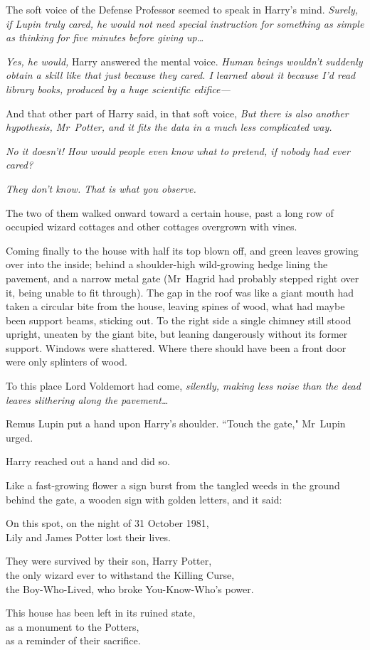 The soft voice of the Defense Professor seemed to speak in Harry's mind. \emph{Surely, if Lupin truly cared, he would not need special instruction for something as simple as thinking for five minutes before giving up{\ldots}}

\emph{Yes, he would,} Harry answered the mental voice. \emph{Human beings wouldn't suddenly obtain a skill like that just because they cared. I learned about it because I'd read library books, produced by a huge scientific edifice—}

And that other part of Harry said, in that soft voice, \emph{But there is also another hypothesis, Mr~Potter, and it fits the data in a much less complicated way.}

\emph{No it doesn't! How would people even know what to pretend, if nobody had ever cared?}

\emph{They don't know. That is what you observe.}

The two of them walked onward toward a certain house, past a long row of occupied wizard cottages and other cottages overgrown with vines.

Coming finally to the house with half its top blown off, and green leaves growing over into the inside; behind a shoulder-high wild-growing hedge lining the pavement, and a narrow metal gate (Mr~Hagrid had probably stepped right over it, being unable to fit through). The gap in the roof was like a giant mouth had taken a circular bite from the house, leaving spines of wood, what had maybe been support beams, sticking out. To the right side a single chimney still stood upright, uneaten by the giant bite, but leaning dangerously without its former support. Windows were shattered. Where there should have been a front door were only splinters of wood.

To this place Lord Voldemort had come, \emph{silently, making less noise than the dead leaves slithering along the pavement{\ldots}}

Remus Lupin put a hand upon Harry's shoulder. ``Touch the gate," Mr~Lupin urged.

Harry reached out a hand and did so.

Like a fast-growing flower a sign burst from the tangled weeds in the ground behind the gate, a wooden sign with golden letters, and it said:

\begin{center}
On this spot, on the night of 31 October 1981,\\
Lily and James Potter lost their lives.

They were survived by their son, Harry Potter,\\
the only wizard ever to withstand the Killing Curse,\\
the Boy-Who-Lived, who broke You-Know-Who's power.

This house has been left in its ruined state,\\
as a monument to the Potters,\\
as a reminder of their sacrifice.
\end{center}

